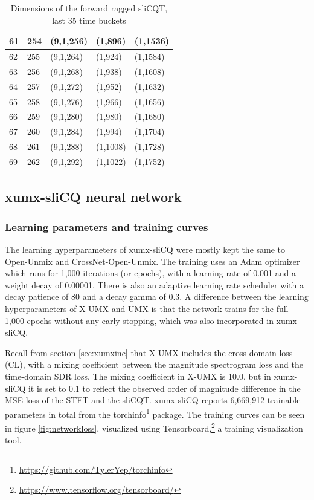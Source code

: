 \documentclass[report.tex]{subfiles}
\begin{document}
\begin{table}[ht]
\begin{tabular}{ |l|l|l|l|l| }
\hline
61 & 254 & (9,1,256) & (1,896) & (1,1536) \\
\hline
62 & 255 & (9,1,264) & (1,924) & (1,1584) \\
\hline
63 & 256 & (9,1,268) & (1,938) & (1,1608) \\
\hline
64 & 257 & (9,1,272) & (1,952) & (1,1632) \\
\hline
65 & 258 & (9,1,276) & (1,966) & (1,1656) \\
\hline
66 & 259 & (9,1,280) & (1,980) & (1,1680) \\
\hline
67 & 260 & (9,1,284) & (1,994) & (1,1704) \\
\hline
68 & 261 & (9,1,288) & (1,1008) & (1,1728) \\
\hline
69 & 262 & (9,1,292) & (1,1022) & (1,1752) \\
\hline
\end{tabular}
	\caption{Dimensions of the forward ragged sliCQT, last 35 time buckets}
	\label{table:slicqdim2}
\end{table}

\newpagefill

\subsection{xumx-sliCQ neural network}

\subsubsection{Learning parameters and training curves}

The learning hyperparameters of xumx-sliCQ were mostly kept the same to Open-Unmix and CrossNet-Open-Unmix. The training uses an Adam optimizer which runs for 1,000 iterations (or epochs), with a learning rate of 0.001 and a weight decay of 0.00001. There is also an adaptive learning rate scheduler with a decay patience of 80 and a decay gamma of 0.3. A difference between the learning hyperparameters of X-UMX and UMX is that the network trains for the full 1,000 epochs without any early stopping, which was also incorporated in xumx-sliCQ.

Recall from section \ref{sec:xumxinc} that X-UMX includes the cross-domain loss (CL), with a mixing coefficient between the magnitude spectrogram loss and the time-domain SDR loss. The mixing coefficient in X-UMX is 10.0, but in xumx-sliCQ it is set to 0.1 to reflect the observed order of magnitude difference in the MSE loss of the STFT and the sliCQT. xumx-sliCQ reports 6,669,912 trainable parameters in total from the torchinfo\footnote{\url{https://github.com/TylerYep/torchinfo}} package. The training curves can be seen in figure \ref{fig:networkloss}, visualized using Tensorboard,\footnote{\url{https://www.tensorflow.org/tensorboard/}} a training visualization tool.
\end{document}
